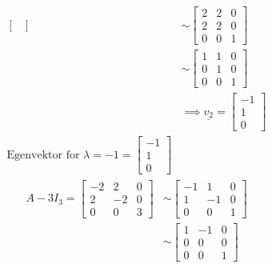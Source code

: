 \documentclass[11pt, a4paper, norsk]{NTNUoving}
\begin{document}
\begin{oppgave}
\begin{punkt}
\begin{align*}
\begin{bmatrix}
                \end{bmatrix} &\sim \begin{bmatrix}
                2 & 2 & 0 \\
                2 & 2 & 0 \\
                0 & 0 & 1
                \end{bmatrix}
                \\
                &\sim \begin{bmatrix}
                    1 & 1 & 0 \\
                    0 & 1 & 0 \\
                    0 & 0 & 1
                \end{bmatrix}
                \\
                &\implies \underline{v_2} = \begin{bmatrix}
                    -1 \\
                    1 \\
                    0
                \end{bmatrix}
                \\
                \text{Egenvektor for } \lambda = -1 = \begin{bmatrix}
                    -1 \\
                    1 \\
                    0
                \end{bmatrix}
            \end{align*}
            \begin{align*}
                A - 3I_3 = \begin{bmatrix}
                    -2 & 2 & 0 \\
                    2 & -2 & 0 \\
                    0 & 0 & 3
                \end{bmatrix} &\sim \begin{bmatrix}
                -1 & 1 & 0 \\
                1 & -1 & 0 \\
                0 & 0 & 1
                \end{bmatrix}
                \\
                &\sim \begin{bmatrix}
                    1 & -1 & 0 \\
                    0 & 0 & 0 \\
                    0 & 0 & 1
                \end{bmatrix}

\end{align*}
\end{punkt}
\end{oppgave}
\end{document}
